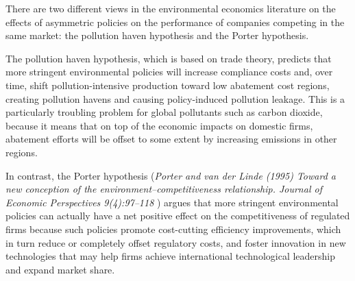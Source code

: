 \documentclass[
]{book}
\begin{document}
There are two different views in the environmental economics literature on the effects of
asymmetric policies on the performance of companies competing in the same market: the
pollution haven hypothesis and the Porter hypothesis.

The pollution haven hypothesis, which
is based on trade theory, predicts that more stringent environmental policies will increase
compliance costs and, over time, shift pollution-intensive production toward low abatement
cost regions, creating pollution havens and causing policy-induced pollution leakage.
This is a particularly troubling problem for global pollutants
such as carbon dioxide, because it means that on top of the economic impacts on domestic
firms, abatement efforts will be offset to some extent by increasing emissions in other regions.

In contrast, the Porter hypothesis (\emph{Porter and van der Linde (1995) Toward a new conception of the
environment--competitiveness relationship. Journal of Economic Perspectives 9(4):97--118 }) argues that more
stringent environmental policies can actually have a net positive effect on the competitiveness
of regulated firms because such policies promote cost-cutting efficiency improvements, which
in turn reduce or completely offset regulatory costs, and foster innovation in new technologies
that may help firms achieve international technological leadership and expand market share.
\end{document}
